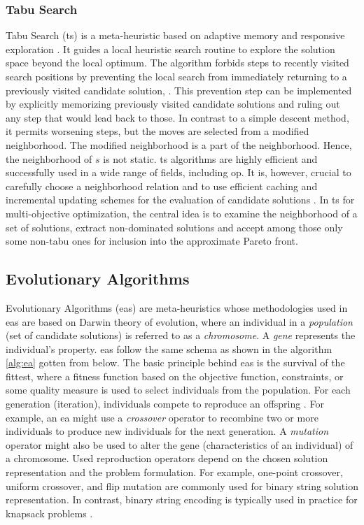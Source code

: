 \subsubsection{Tabu Search}
Tabu Search (\gls{ts}) is a meta-heuristic based on adaptive memory and responsive exploration \parencite{Gonzalez2007HandbookMetaheuristics}. It guides a local heuristic search routine to explore the solution
space beyond the local optimum. The algorithm forbids steps to recently visited search positions by preventing the local search from immediately returning to a previously visited candidate solution, \parencite{HolgerH2013StochasticApplications}. This prevention step can be implemented by explicitly memorizing previously visited candidate solutions and ruling out any step that would lead back to those. In contrast to a simple descent method, it permits worsening steps, but the moves are selected from a modified neighborhood. The modified neighborhood is a part of the neighborhood. Hence, the neighborhood of $s$ is not static. \Gls{ts} algorithms are highly efficient and successfully used in a wide range of fields, including \gls{op}. It is, however, crucial to carefully choose a neighborhood relation and to use efficient caching and incremental updating schemes for the evaluation of candidate solutions \parencite{HolgerH2013StochasticApplications}. In \gls{ts} for multi-objective optimization, the central idea is to examine the neighborhood of a set of solutions, extract non-dominated solutions and accept among those only some non-tabu ones for inclusion into the approximate Pareto front. 

\subsection{Evolutionary Algorithms}
Evolutionary Algorithms (\glspl{ea}) are meta-heuristics whose methodologies used in \glspl{ea} are based on Darwin theory of evolution, where an individual in a \textit{population} (set of candidate solutions) is referred to as a \textit{chromosome}. A \textit{gene} represents the individual's property. \glspl{ea} follow the same schema as shown in the algorithm \ref{alg:ea} gotten from \parencite{Gonzalez2007HandbookMetaheuristics} below. The basic principle behind \glspl{ea} is the survival of the fittest, where a fitness function based on the objective function, constraints, or some quality measure is used to select individuals from the population. For each generation (iteration), individuals compete to reproduce an offspring \parencite{Engelbrecht2007ComputationalEdition}. For example, an \gls{ea} might use a \textit{crossover} operator to recombine two or more individuals to produce new individuals for the next generation. A \textit{mutation} operator might also be used to alter the gene (characteristics of an individual) of a chromosome. Used reproduction operators depend on the chosen solution representation and the problem formulation. For example, one-point crossover, uniform crossover, and flip mutation are commonly used for binary string solution representation. In contrast, binary string encoding is typically used in practice for knapsack problems \parencite{Gonzalez2007HandbookMetaheuristics}.  

